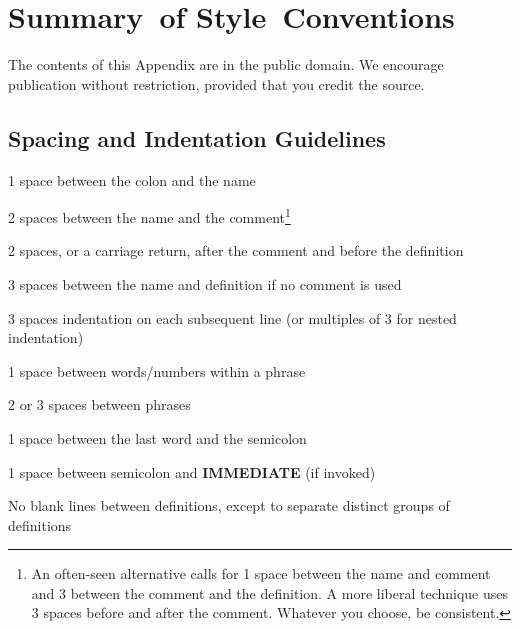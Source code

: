 \chapter{Summary~of
Style~Conventions}
The contents of this Appendix are in the public domain. We encourage
publication without restriction, provided that you credit the source.
\section{Spacing and Indentation Guidelines}
\begin{list}
{}{\setlength{\parsep}{0cm}}
\item 1 space between the colon and the name
\item 2 spaces between the name and the comment\footnote{
An often-seen alternative calls for 1 space between the name and comment and 3 between
the comment and the definition. A more liberal technique uses 3 spaces before and after the
comment. Whatever you choose, be consistent.
}
\item 2 spaces, or a carriage return, after the comment and before the definition\footnotemark[1]
\item 3 spaces between the name and definition if no comment is used
\item 3 spaces indentation on each subsequent line (or multiples of 3 for nested indentation)
\item 1 space between words/numbers within a phrase
\item 2 or 3 spaces between phrases
\item 1 space between the last word and the semicolon
\item 1 space between semicolon and {\bf IMMEDIATE} (if invoked)
\end{list}
No blank lines between definitions, except to separate distinct groups of
definitions

